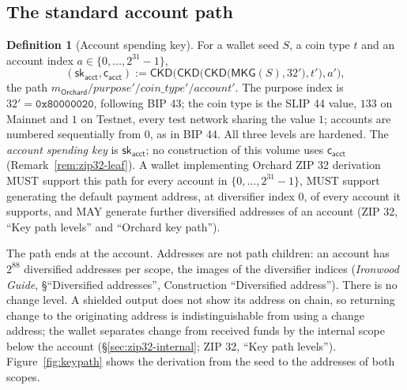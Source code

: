 \documentclass[11pt,a4paper]{article}
\theoremstyle{definition}
\newtheorem{definition}[theorem]{Definition}
\begin{document}
\subsection{The standard account path}\label{sec:zip32-path}

\begin{definition}[Account spending key]\label{def:zip32-account}
For a wallet seed $S$, a coin type $t$ and an account index
$a \in \{0, \dots, 2^{31} - 1\}$,
\[
  (\mathsf{sk}_{\mathsf{acct}}, \mathsf{c}_{\mathsf{acct}}) :=
  \mathsf{CKD}\bigl(\mathsf{CKD}\bigl(\mathsf{CKD}\bigl(\mathsf{MKG}(S),
    32'\bigr), t'\bigr), a'\bigr),
\]
the path $m_{\mathsf{Orchard}} / \mathit{purpose}' / \mathit{coin\_type}' /
\mathit{account}'$. The purpose index is $32' = \mathtt{0x80000020}$,
following BIP 43; the coin type is the SLIP 44 value, $133$ on Mainnet and
$1$ on Testnet, every test network sharing the value $1$; accounts are
numbered sequentially from $0$, as in BIP 44. All three levels are
hardened. The \emph{account spending key} is $\mathsf{sk}_{\mathsf{acct}}$;
no construction of this volume uses $\mathsf{c}_{\mathsf{acct}}$
(Remark~\ref{rem:zip32-leaf}). A wallet implementing Orchard ZIP 32
derivation MUST support this path for every account in
$\{0, \dots, 2^{31} - 1\}$, MUST support generating the default payment
address, at diversifier index $0$, of every account it supports, and MAY
generate further diversified addresses of an account (ZIP 32, ``Key path
levels'' and ``Orchard key path'').
\end{definition}

The path ends at the account. Addresses are not path children: an account
has $2^{88}$ diversified addresses per scope, the images of the diversifier
indices (\emph{Ironwood Guide}, \S``Diversified addresses'', Construction
``Diversified address''). There is no change level. A shielded output does
not show its address on chain, so returning change to the originating
address is indistinguishable from using a change address; the wallet
separates change from received funds by the internal scope below the
account (\S\ref{sec:zip32-internal}; ZIP 32, ``Key path levels'').
Figure~\ref{fig:keypath} shows the derivation from the seed to the
addresses of both scopes.
\end{document}
